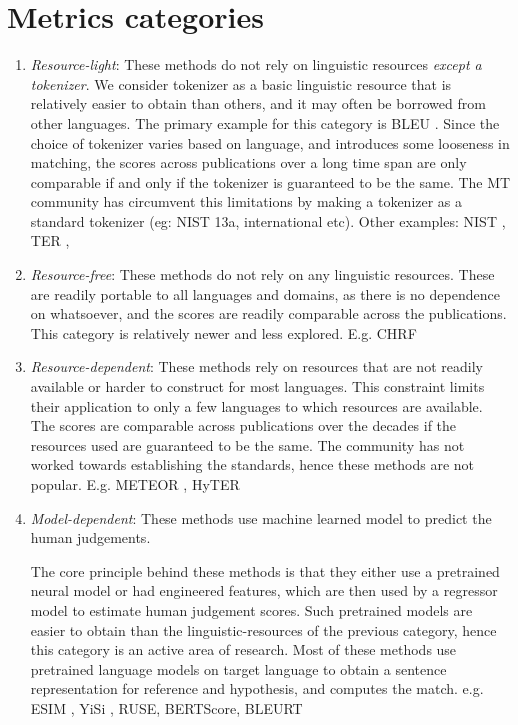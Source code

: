 \section{Metrics categories} 
\begin{enumerate}
    \item \textit{Resource-light}: These methods do not rely on linguistic resources \textit{except a tokenizer}. We consider tokenizer as a basic linguistic resource that is relatively easier to obtain than others, and it may often be borrowed from other languages.  
    The primary example for this category is BLEU \cite{papineni-etal-2002-bleu}.
    Since the choice of tokenizer varies based on language, and introduces some looseness in matching, the scores across publications over a long time span are only comparable if and only if the tokenizer is guaranteed to be the same. 
    The MT community has circumvent this limitations by making a tokenizer as a standard tokenizer (eg: NIST 13a, international etc).
    Other examples: NIST \cite{doddington2002-nist}, TER \cite{snover2006TER}, 
    
    \item \textit{Resource-free}: These methods do not rely on any linguistic resources. 
    These are readily portable to all languages and domains, as there is no dependence on whatsoever, and the scores are readily comparable across the publications. This category is relatively newer and less explored. E.g. CHRF \cite{popovic-2015-chrf}
    
    \item \textit{Resource-dependent}: These methods rely on resources that are not readily available or harder to construct for most languages. 
    This constraint limits their application to only a few languages to which resources are available. 
    The scores are comparable across publications over the decades if the resources used are guaranteed to be the same. The community has not worked towards establishing the standards, hence these methods are not popular.
    E.g. METEOR \cite{banerjee-lavie-2005-meteor}, HyTER \cite{dreyer-marcu-2012-hyter}

    
    \item \textit{Model-dependent}: These methods use machine learned model to predict the human judgements. 

    The core principle behind these methods is that they either use a pretrained neural model or had engineered features, which are then used by a regressor model to estimate human judgement scores.
    Such pretrained models are easier to obtain than the linguistic-resources of the previous category, hence this category is an active area of research.  
    Most of these methods use pretrained language models on target language to obtain a sentence representation for reference and hypothesis, and computes the match. e.g. ESIM \cite{mathur-etal-2019-ESIM}, YiSi \cite{lo-2019-yisi}, RUSE, BERTScore, BLEURT
    

\end{enumerate}
